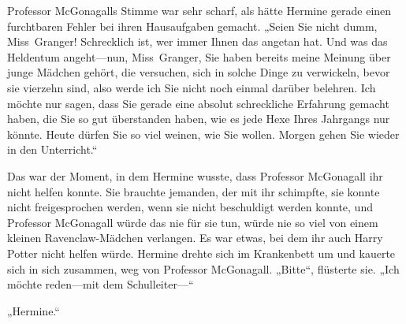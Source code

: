 Professor McGonagalls Stimme war sehr scharf, als hätte Hermine gerade einen furchtbaren Fehler bei ihren Hausaufgaben gemacht.
„Seien Sie nicht dumm, Miss~Granger! Schrecklich ist, wer immer Ihnen das angetan hat. Und was das Heldentum angeht—nun, Miss~Granger, Sie haben bereits meine Meinung über junge Mädchen gehört, die versuchen, sich in solche Dinge zu verwickeln, bevor sie vierzehn sind, also werde ich Sie nicht noch einmal darüber belehren. Ich möchte nur sagen, dass Sie gerade eine absolut schreckliche Erfahrung gemacht haben, die Sie so gut überstanden haben, wie es jede Hexe Ihres Jahrgangs nur könnte. Heute dürfen Sie so viel weinen, wie Sie wollen. Morgen gehen Sie wieder in den Unterricht.“

Das war der Moment, in dem Hermine wusste, dass Professor McGonagall ihr nicht helfen konnte. Sie brauchte jemanden, der mit ihr schimpfte, sie konnte nicht freigesprochen werden, wenn sie nicht beschuldigt werden konnte, und Professor McGonagall würde das nie für sie tun, würde nie so viel von einem kleinen Ravenclaw-Mädchen verlangen. Es war etwas, bei dem ihr auch Harry Potter nicht helfen würde. Hermine drehte sich im Krankenbett um und kauerte sich in sich zusammen, weg von Professor McGonagall.
„Bitte“, flüsterte sie. „Ich möchte reden—mit dem Schulleiter—“

\later

„Hermine.“

